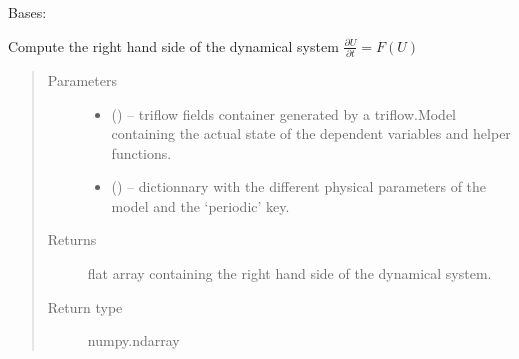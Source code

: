 \documentclass[letterpaper,10pt,english]{sphinxmanual}
\begin{document}
\begin{fulllineitems}
\label{\detokenize{triflow.core:triflow.core.routines.F_Routine}}
Bases: {\hyperref[\detokenize{triflow.core:triflow.core.routines.ModelRoutine}]{}}

Compute the right hand side of the dynamical system
\(\frac{\partial U}{\partial t} = F(U)\)
\begin{quote}\begin{description}
\item[{Parameters}] \leavevmode\begin{itemize}
\item {} 
 () -- triflow fields container generated by a triflow.Model containing the actual state of the dependent variables and helper functions.

\item {} 
 () -- dictionnary with the different physical parameters of the model and the `periodic' key.

\end{itemize}

\item[{Returns}] \leavevmode
flat array containing the right hand side of the dynamical system.

\item[{Return type}] \leavevmode
numpy.ndarray

\end{description}\end{quote}

\begin{fulllineitems}
\label{\detokenize{triflow.core:triflow.core.routines.F_Routine.diff_approx}}
\end{fulllineitems}


\end{fulllineitems}

\end{document}
